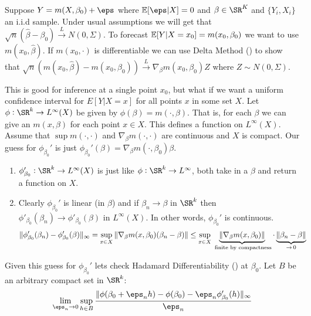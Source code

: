 \begin{example}
	\label{ex:semi-parametric-delta-method}
	Suppose  \(Y=m(X,\beta_0)+\eps\) where \(\E[\eps|X]=0\) and \(\beta\in\SR^K\) and \(\{Y_i,X_i\}\) an i.i.d sample. Under usual assumptions we will get that  \(\sqrt{n}(\widehat\beta-\beta_0)\overset{L}{\to}N(0,\Sigma)\). To forecast \(\mathbb{E}[Y|X=x_0]=m(x_0,\beta_0)\) we want to use \(m(x_0,\widehat\beta)\). If \(m(x_0,\cdot)\) is differentiable we can use Delta Method () to show that \(\sqrt{n}(m(x_0,\widehat\beta)-m(x_0,\beta_0))\overset{L}{\to}\nabla_\beta m(x_0,\beta_0) Z\) where \(Z\sim N(0,\Sigma)\).

	This is good for inference at a single point \(x_0\), but what if we want a uniform confidence interval for \(E[Y|X=x]\) for all points  \(x\) in some set \(X\). Let  \(\phi:\SR^k\to L^\infty(X)\) be given by \(\phi(\beta)=m(\cdot,\beta)\). That is, for each  \(\beta\) we can give an  \(m(x,\beta)\) for each point  \(x\in X\). This defines a function on  \(L^\infty(X)\). Assume that  \(\sup m(\cdot, \cdot)\) and  \(\nabla_\beta m(\cdot,\cdot)\) are continuous and  \(X\) is compact. Our guess for  \(\phi_{\beta_0}'\) is just  \(\phi_{\beta_0}'(\beta) =\nabla_\beta m(\cdot,\beta_0)\beta\). 
	\begin{enumerate}
		\item \(\phi_{\beta_0}':\SR^k\to L^\infty(X)\) is just like \(\phi:\SR^k\to L^{\infty}\), both take in a \(\beta\) and return a function on  \(X\). 
		\item Clearly \(\phi_{\beta_0}'\) is linear  (in  \(\beta\)) and if  \(\beta_n\to\beta\) in  \(\SR^k\) then \(\phi'_{\beta_0}(\beta_n)\to \phi'_{\beta_0}(\beta)\) in  \(L^\infty(X)\). In other words, \(\phi_{\beta_0}'\) is continuous.
		\begin{align*}
			\|\phi'_{\beta_0}(\beta_n)-\phi_{\beta_0}'(\beta)\|_\infty 
			&= \sup_{x\in X} \|\nabla_\beta m(x,\beta_0)(\beta_n-\beta)\| \leq \sup_{x\in X}\underbrace{\|\nabla_\beta m(x,\beta_0)\|}_{\text{ finite by compactness}}\cdot  \underbrace{\vphantom{\nabla_\beta}\|\beta_n-\beta\|}_{\to\, 0}
		\end{align*}
	\end{enumerate}
	Given this guess for \(\phi_{\beta_0}'\) lets check Hadamard Differentiability () at \(\beta_0\). Let \(B\) be an arbitrary compact set in  \(\SR^k\):
	\begin{align*}
		\lim_{\eps_n\to 0}\sup_{h\in B} \frac{\|\phi(\beta_0+\eps_nh)-\phi(\beta_0) -\eps_n\phi'_{\beta_0}(h)\|_\infty}{\eps_n} 

\end{align*}
\end{example}
